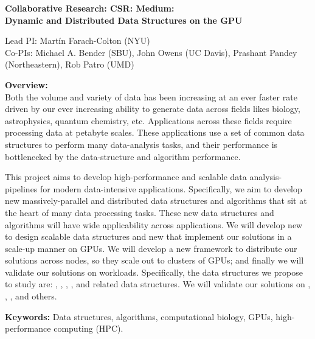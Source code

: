 
\begin{center}

\bf
\Large
Collaborative Research: CSR: Medium: \\Dynamic and Distributed Data Structures on the GPU

\small
Lead PI: Mart\'{i}n Farach-Colton (NYU) \\
Co-PIs: Michael A. Bender (SBU), John Owens (UC Davis), Prashant Pandey (Northeastern), Rob Patro (UMD)
\end{center}

\vspace{-0.3cm}

\noindent \textbf{\large Overview:}\\
Both the volume and variety of data has been increasing at an ever faster rate
driven by our ever increasing ability to generate data across fields likes
biology, astrophysics, quantum chemistry, etc. Applications across these
fields require processing data at petabyte scales. These applications use a set
of common data structures to perform many data-analysis tasks, and their
performance is bottlenecked by the data-structure and algorithm performance.

This project aims to develop high-performance and scalable data
analysis-pipelines for modern data-intensive applications. Specifically, we aim
to develop new massively-parallel and distributed data structures and
algorithms that sit at the heart of many data processing tasks. These new data
structures and algorithms will have wide applicability across applications.
%
We will develop new  to design scalable data
structures and new  that implement our solutions in a scale-up
manner on GPUs. We will develop a new framework to distribute our solutions
across nodes, so they scale out to clusters of GPUs; and finally we will
validate our solutions on  workloads.
%
Specifically, the data structures we propose to study are: ,
, , , and related
data structures.  We will validate our solutions on , , ,  and others.

\noindent \textbf{\large Keywords:} Data structures, algorithms, computational
biology, GPUs, high-performance computing (HPC).


